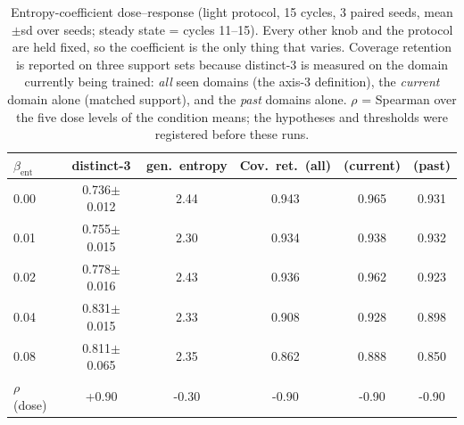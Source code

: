 \begin{table}[t]
\caption{Entropy-coefficient dose--response (light protocol, 15 cycles, 3 paired seeds, mean$\pm$sd over seeds; steady state = cycles 11--15). Every other knob and the protocol are held fixed, so the coefficient is the only thing that varies. Coverage retention is reported on three support sets because distinct-3 is measured on the domain currently being trained: \emph{all} seen domains (the axis-3 definition), the \emph{current} domain alone (matched support), and the \emph{past} domains alone. $\rho$ = Spearman over the five dose levels of the condition means; the hypotheses and thresholds were registered before these runs.}
\label{tab:dose}
\centering
\begin{tabular}{@{}lccccc@{}}
\toprule
$\beta_{\mathrm{ent}}$ & distinct-3 & gen.\ entropy & Cov.\ ret.\ (all) & (current) & (past) \\
\midrule
0.00 & 0.736$\pm$0.012 & 2.44 & 0.943 & 0.965 & 0.931 \\
0.01 & 0.755$\pm$0.015 & 2.30 & 0.934 & 0.938 & 0.932 \\
0.02 & 0.778$\pm$0.016 & 2.43 & 0.936 & 0.962 & 0.923 \\
0.04 & 0.831$\pm$0.015 & 2.33 & 0.908 & 0.928 & 0.898 \\
0.08 & 0.811$\pm$0.065 & 2.35 & 0.862 & 0.888 & 0.850 \\
\midrule
$\rho$ (dose) & +0.90 & -0.30 & -0.90 & -0.90 & -0.90 \\
\bottomrule
\end{tabular}
\end{table}
